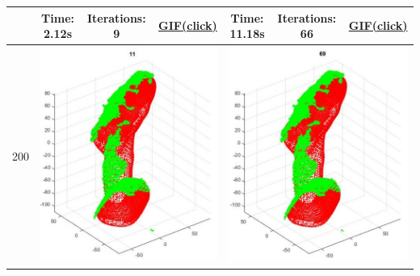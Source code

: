 \documentclass[letterpaper, 10 pt, conference]{ieeeconf}  %
\begin{document}
\begin{table}
\begin{tabular}{ccccccc}
 & Time: 2.12s & Iterations: 9 & \href{http://gph.is/1WElekI}{\textbf{GIF(click)}} & Time: 11.18s & Iterations: 66 & \href{http://gph.is/1rPINfj}{\textbf{GIF(click)}}\\ 
\midrule
200 & \multicolumn{3}{c}{\includegraphics[scale=0.43]{d200p.jpg}} & \multicolumn{3}{c}{\includegraphics[scale=0.43]{d200o.jpg}}\\ 

\end{tabular}
\end{table}
\end{document}
